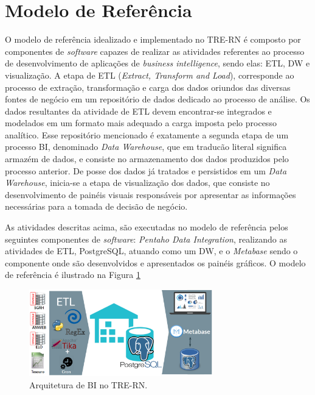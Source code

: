 \section{Modelo de Referência}
O modelo de referência idealizado e implementado no TRE-RN é composto por componentes de \textit{software} capazes de realizar as atividades referentes ao processo de desenvolvimento de aplicações de \textit{business intelligence}, sendo elas: ETL, DW e visualização.
A etapa de ETL (\textit{Extract, Transform and Load}), corresponde ao processo de extração, transformação e carga dos dados oriundos das diversas fontes de negócio em um repositório de dados dedicado ao processo de análise. Os dados resultantes da atividade de ETL devem encontrar-se integrados e modelados em um formato mais adequado a carga imposta pelo processo analítico. 
Esse repositório mencionado é exatamente a segunda etapa de um processo BI, denominado \textit{Data Warehouse}, que em traducão literal significa armazém de dados, e consiste no armazenamento dos dados produzidos pelo processo anterior.
De posse dos dados já tratados e persistidos em um \textit{Data Warehouse}, inicia-se a etapa de visualização dos dados, que consiste no desenvolvimento de painéis visuais responsáveis por apresentar as informações necessárias para a tomada de decisão de negócio.

As atividades descritas acima, são executadas no modelo de referência pelos seguintes componentes de \textit{software}: \textit{Pentaho Data Integration}, realizando as atividades de ETL, PostgreSQL, atuando como um DW, e o \textit{Metabase} sendo o componente onde são desenvolvidos e apresentados os painéis gráficos. O modelo de referência é ilustrado na Figura \ref{fig:modelo_referencia}

\begin{figure}[htp]
   \centering
    \includegraphics[width=8cm]{Imagens/Arq_TRE}
    \caption{Arquitetura de BI no TRE-RN.}
    \label{fig:modelo_referencia}
\end{figure} 

